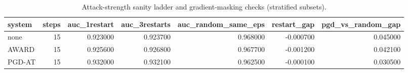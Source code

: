 \begin{table}[htbp]\centering\caption{Attack-strength sanity ladder and gradient-masking checks (stratified subsets).}\label{tab:sanity}
\begin{tabular}{lrrrrrr}
\toprule
system & steps & auc_1restart & auc_3restarts & auc_random_same_eps & restart_gap & pgd_vs_random_gap \\
\midrule
none & 15 & 0.923000 & 0.923700 & 0.968000 & -0.000700 & 0.045000 \\
AWARD & 15 & 0.925600 & 0.926800 & 0.967700 & -0.001200 & 0.042100 \\
PGD-AT & 15 & 0.932000 & 0.932100 & 0.962500 & -0.000100 & 0.030500 \\
\bottomrule
\end{tabular}
\end{table}
